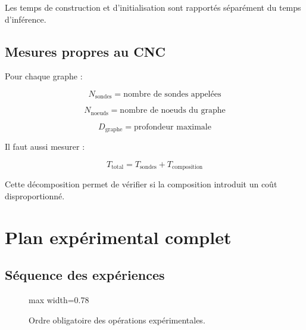 \documentclass[11pt,a4paper]{article}
\begin{document}
Les temps de construction et d'initialisation
sont rapportés séparément du temps d'inférence.

\subsection{Mesures propres au CNC}

Pour chaque graphe :

\[
N_{\mathrm{sondes}}
=
\text{nombre de sondes appelées}
\]

\[
N_{\mathrm{noeuds}}
=
\text{nombre de noeuds du graphe}
\]

\[
D_{\mathrm{graphe}}
=
\text{profondeur maximale}
\]

Il faut aussi mesurer :

\[
T_{\mathrm{total}}
=
T_{\mathrm{sondes}}
+
T_{\mathrm{composition}}
\]

Cette décomposition permet de vérifier si la composition
introduit un coût disproportionné.

\section{Plan expérimental complet}

\subsection{Séquence des expériences}

\begin{figure}[H]
\centering
\begin{adjustbox}{max width=0.78\textwidth}
\end{adjustbox}
\caption{Ordre obligatoire des opérations expérimentales.}
\end{figure}
\end{document}
